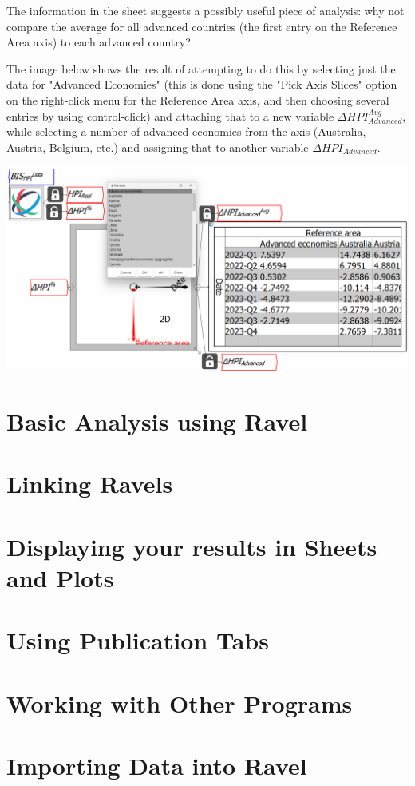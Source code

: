 The information in the sheet suggests a possibly useful piece of analysis: why not compare the average for all advanced countries (the first entry on the Reference Area axis) to each advanced country?

The image below shows the result of attempting to do this by selecting just the data for "Advanced Economies" (this is done using the "Pick Axis Slices" option on the right-click menu for the Reference Area axis, and then choosing several entries by using control-click) and attaching that to a new variable $\Delta{HPI}_{Advanced}^{Avg}$, while selecting a number of advanced economies from the axis (Australia, Austria, Belgium, etc.) and assigning that to another variable $\Delta{HPI}_{Advanced}$.

\includegraphics{images/tut07SeparatingAdvancedAverage.png}



\section{Basic Analysis using Ravel}
\section{Linking Ravels}
\section{Displaying your results in Sheets and Plots}
\section{Using Publication Tabs}
\section{Working with Other Programs}
\section{Importing Data into Ravel}

